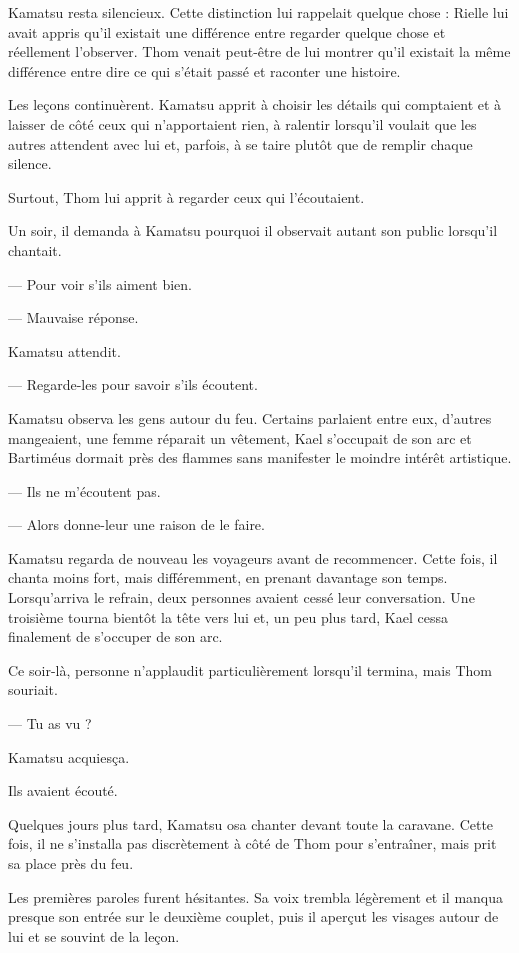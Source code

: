 Kamatsu resta silencieux. Cette distinction lui rappelait quelque chose :
Rielle lui avait appris qu'il existait une différence entre regarder quelque
chose et réellement l'observer. Thom venait peut-être de lui montrer qu'il
existait la même différence entre dire ce qui s'était passé et raconter une
histoire.

\scenebreak

Les leçons continuèrent. Kamatsu apprit à choisir les détails qui comptaient et
à laisser de côté ceux qui n'apportaient rien, à ralentir lorsqu'il voulait que
les autres attendent avec lui et, parfois, à se taire plutôt que de remplir
chaque silence.

Surtout, Thom lui apprit à regarder ceux qui l'écoutaient.

Un soir, il demanda à Kamatsu pourquoi il observait autant son public lorsqu'il
chantait.

— Pour voir s'ils aiment bien.

— Mauvaise réponse.

Kamatsu attendit.

— Regarde-les pour savoir s'ils écoutent.

Kamatsu observa les gens autour du feu. Certains parlaient entre eux, d'autres
mangeaient, une femme réparait un vêtement, Kael s'occupait de son arc et
Bartiméus dormait près des flammes sans manifester le moindre intérêt
artistique.

— Ils ne m'écoutent pas.

— Alors donne-leur une raison de le faire.

Kamatsu regarda de nouveau les voyageurs avant de recommencer. Cette fois, il
chanta moins fort, mais différemment, en prenant davantage son temps.
Lorsqu'arriva le refrain, deux personnes avaient cessé leur conversation. Une
troisième tourna bientôt la tête vers lui et, un peu plus tard, Kael cessa
finalement de s'occuper de son arc.

Ce soir-là, personne n'applaudit particulièrement lorsqu'il termina, mais Thom
souriait.

— Tu as vu ?

Kamatsu acquiesça.

Ils avaient écouté.

\scenebreak

Quelques jours plus tard, Kamatsu osa chanter devant toute la caravane. Cette
fois, il ne s'installa pas discrètement à côté de Thom pour s'entraîner, mais
prit sa place près du feu.

Les premières paroles furent hésitantes. Sa voix trembla légèrement et il
manqua presque son entrée sur le deuxième couplet, puis il aperçut les visages
autour de lui et se souvint de la leçon.

